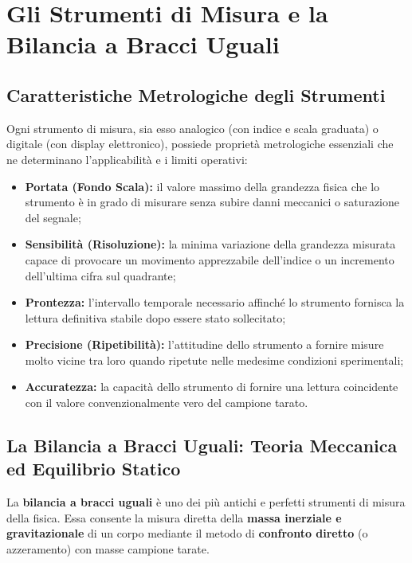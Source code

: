 \documentclass[11pt,a4paper,oneside]{report}
\begin{document}
\chapter{Gli Strumenti di Misura e la Bilancia a Bracci Uguali}

\section{Caratteristiche Metrologiche degli Strumenti}
Ogni strumento di misura, sia esso analogico (con indice e scala graduata) o digitale (con display elettronico), possiede proprietà metrologiche essenziali che ne determinano l'applicabilità e i limiti operativi:
\begin{itemize}
  \item \textbf{Portata (Fondo Scala):} il valore massimo della grandezza fisica che lo strumento è in grado di misurare senza subire danni meccanici o saturazione del segnale;
  \item \textbf{Sensibilità (Risoluzione):} la minima variazione della grandezza misurata capace di provocare un movimento apprezzabile dell'indice o un incremento dell'ultima cifra sul quadrante;
  \item \textbf{Prontezza:} l'intervallo temporale necessario affinché lo strumento fornisca la lettura definitiva stabile dopo essere stato sollecitato;
  \item \textbf{Precisione (Ripetibilità):} l'attitudine dello strumento a fornire misure molto vicine tra loro quando ripetute nelle medesime condizioni sperimentali;
  \item \textbf{Accuratezza:} la capacità dello strumento di fornire una lettura coincidente con il valore convenzionalmente vero del campione tarato.
\end{itemize}

\section{La Bilancia a Bracci Uguali: Teoria Meccanica ed Equilibrio Statico}
La \textbf{bilancia a bracci uguali} è uno dei più antichi e perfetti strumenti di misura della fisica. Essa consente la misura diretta della \textbf{massa inerziale e gravitazionale} di un corpo mediante il metodo di \textbf{confronto diretto} (o azzeramento) con masse campione tarate.
\end{document}
